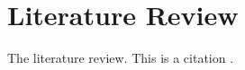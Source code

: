 \chapter{Literature Review}\label{c:literature}

The literature review. This is a citation \cite{adams1995hitchhiker}.

